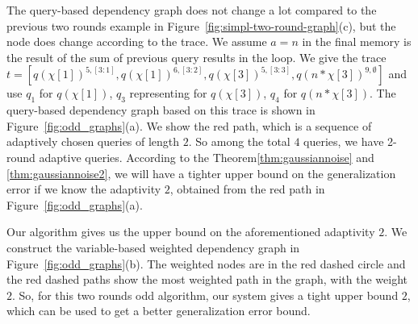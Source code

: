                                     The query-based dependency graph does not change a lot compared to the previous two rounds example in Figure~\ref{fig:simpl-two-round-graph}(c), but the node does change according to the trace. We assume $a = n$ in the final memory is the result of the sum of previous query results in the loop.
                                    We give the trace $t = [q(\chi[1])^{5,[3:1]}, q(\chi[1])^{6,[3:2]}, q(\chi[3])^{5,[3:3]}, q(n* \chi[3])^{9,\emptyset} ]$ and use $q_1$ for $q(\chi[1])$, $q_3$ representing for $q(\chi[3])$, $q_4$ for $q(n* \chi[3])$. The query-based dependency graph based on this trace is shown in Figure~\ref{fig:odd_graphs}(a). We show the red path, which is a sequence of adaptively chosen queries of length $2$. So among the total $4$ queries, we have 2-round adaptive queries. According to the Theorem\ref{thm:gaussiannoise} and \ref{thm:gaussiannoise2}, we will have a tighter upper bound on the generalization error if we know the adaptivity $2$, obtained from the red path in Figure~\ref{fig:odd_graphs}(a). 
                                    
                                    Our algorithm {\THESYSTEM} gives us the upper bound on the aforementioned adaptivity $2$. We construct the variable-based weighted dependency graph in Figure~\ref{fig:odd_graphs}(b). The weighted nodes are in the red dashed circle and the red dashed paths show the most weighted path in the graph, with the weight $2$. So, for this two rounds odd algorithm, our system gives a tight upper bound $2$, which can be used to get a better generalization error bound.
                                    
                                    
                                    
